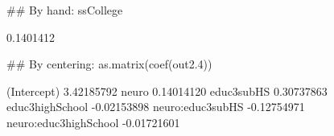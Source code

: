 \begin{Schunk}
\begin{Sinput}
 ## By hand:
 ssCollege
\end{Sinput}
\begin{Soutput}
[1] 0.1401412
\end{Soutput}
\begin{Sinput}
 ## By centering:
 as.matrix(coef(out2.4))
\end{Sinput}
\begin{Soutput}
                             [,1]
(Intercept)            3.42185792
neuro                  0.14014120
educ3subHS             0.30737863
educ3highSchool       -0.02153898
neuro:educ3subHS      -0.12754971
neuro:educ3highSchool -0.01721601
\end{Soutput}
\end{Schunk}
